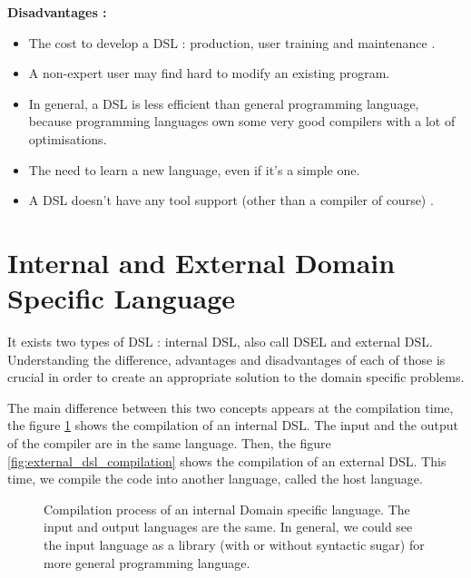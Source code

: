 \textbf{Disadvantages \cite{VanDeursen2000}:}
\begin{itemize}
\item The cost to develop a DSL : production, user training and
  maintenance .
\item A non-expert user may find hard to modify an existing program.
\item In general, a DSL is less efficient than general programming language,
  because programming languages own some very good compilers with a lot of
  optimisations.
\item The need to learn a new language, even if it's a simple one.
\item A DSL doesn't have any tool support (other than a compiler of course) \cite{Mernik2005}.
\end{itemize}

\section{Internal and External Domain Specific Language}
\label{sec:internal_and_external_dsl}

It exists two types of \gls{DSL} : internal \gls{DSL}, also call \gls{DSEL} and
external DSL. Understanding the difference, advantages and disadvantages of each
of those is crucial in order to create an appropriate solution to the domain
specific problems.

The main difference between this two concepts appears at the compilation time,
the figure \ref{fig:internal_dsl_compilation} shows the compilation of an
internal DSL. The input and the output of the compiler are in the same language.
Then, the figure \ref{fig:external_dsl_compilation} shows the compilation of an
external DSL. This time, we compile the code into another language, called the host language.

\begin{figure}[ht]
  \centering
  \caption[Compilation process of an internal \gls{DSL}]{Compilation process of
    an internal Domain specific language. The input and output languages are the
    same. In general, we could see the input language as a library (with or
    without syntactic sugar) for more general programming language.}
  \label{fig:internal_dsl_compilation}
\end{figure}

